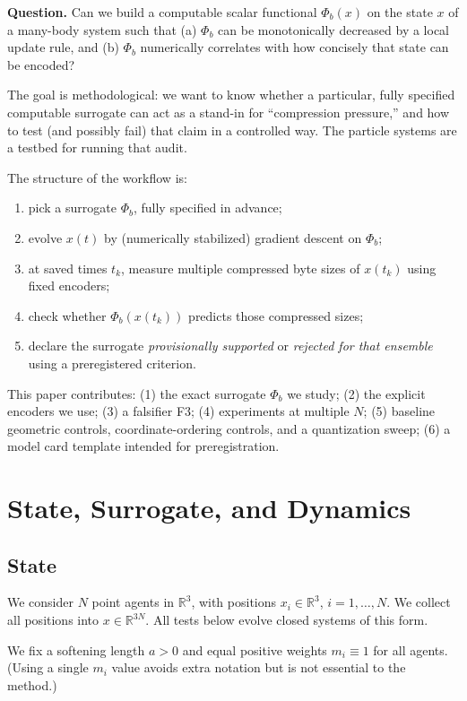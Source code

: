 \documentclass[11pt,a4paper]{article}
\numberwithin{equation}{section}
\newcommand{\R}{\mathbb{R}}
\newcommand{\phib}{\Phi_b}
\begin{document}
\medskip
\noindent
\textbf{Question.} Can we build a computable scalar functional $\phib(x)$ on the state $x$ of a many-body system such that (a) $\phib$ can be monotonically decreased by a local update rule, and (b) $\phib$ numerically correlates with how concisely that state can be encoded?

\medskip
The goal is methodological: we want to know whether a particular, fully specified computable surrogate can act as a stand-in for ``compression pressure,'' and how to test (and possibly fail) that claim in a controlled way. The particle systems are a testbed for running that audit.

The structure of the workflow is:
\begin{enumerate}[label=(\roman*)]
\item pick a surrogate $\phib$, fully specified in advance;
\item evolve $x(t)$ by (numerically stabilized) gradient descent on $\phib$;
\item at saved times $t_k$, measure multiple compressed byte sizes of $x(t_k)$ using fixed encoders;
\item check whether $\phib(x(t_k))$ predicts those compressed sizes;
\item declare the surrogate \emph{provisionally supported} or \emph{rejected for that ensemble} using a preregistered criterion.
\end{enumerate}

This paper contributes: (1) the exact surrogate $\phib$ we study; (2) the explicit encoders we use; (3) a falsifier F3; (4) experiments at multiple $N$; (5) baseline geometric controls, coordinate-ordering controls, and a quantization sweep; (6) a model card template intended for preregistration.

\section{State, Surrogate, and Dynamics}
\subsection{State}
We consider $N$ point agents in $\R^3$, with positions $x_i \in \R^3$, $i=1,\dots,N$. We collect all positions into $x \in \R^{3N}$. All tests below evolve closed systems of this form.

We fix a softening length $a>0$ and equal positive weights $m_i \equiv 1$ for all agents. (Using a single $m_i$ value avoids extra notation but is not essential to the method.)
\end{document}
